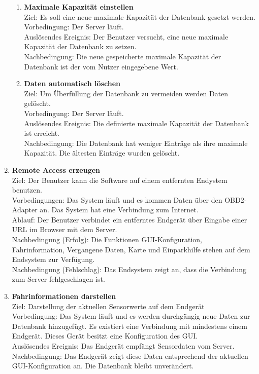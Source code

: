 \documentclass[pflichtenheft.tex]{subfiles}
\begin{document}
\begin{enumerate}
\begin{enumerate}
		\item{\textbf{Maximale Kapazität einstellen}} \\ Ziel: Es soll eine neue maximale Kapazität der Datenbank gesetzt werden. \\ Vorbedingung: Der Server läuft. \\ Auslösendes Ereignis: Der Benutzer versucht, eine neue maximale Kapazität der Datenbank zu setzen. \\ Nachbedingung: Die neue gespeicherte maximale Kapazität der Datenbank ist der vom Nutzer eingegebene Wert.
		
		\item{\textbf{Daten automatisch löschen}} \\ Ziel: Um Überfüllung der Datenbank zu vermeiden werden Daten gelöscht. \\ Vorbedingung: Der Server läuft. \\ Auslösendes Ereignis: Die definierte maximale Kapazität der Datenbank ist erreicht. \\ Nachbedingung: Die Datenbank hat weniger Einträge als ihre maximale Kapazität. Die ältesten Einträge wurden gelöscht.
		
	\end{enumerate} 

	\item{\textbf{Remote Access erzeugen}} \\ Ziel: Der Benutzer kann die Software auf einem entfernten Endystem benutzen.\\ Vorbedingungen: Das System läuft und es kommen Daten über den OBD2-Adapter an. Das System hat eine Verbindung zum Internet. \\ Ablauf: Der Benutzer verbindet ein entferntes Endgerät über Eingabe einer URL im Browser mit dem Server.\\ Nachbedingung (Erfolg): Die Funktionen GUI-Konfiguration, Fahrinformation, Vergangene Daten, Karte und Einparkhilfe stehen auf dem Endsystem zur Verfügung. \\ Nachbedingung (Fehlschlag): Das Endsystem zeigt an, dass die Verbindung zum Server fehlgeschlagen ist.

	\item{\textbf{Fahrinformationen darstellen}} \\ Ziel: Darstellung der aktuellen Sensorwerte auf dem Endgerät \\ Vorbedingung: Das System läuft und es werden durchgängig neue Daten zur Datenbank hinzugefügt. Es existiert eine Verbindung mit mindestens einem Endgerät. Dieses Gerät besitzt eine Konfiguration des GUI. \\ Auslösendes Ereignis: Das Endgerät empfängt Sensordaten vom Server.\\ Nachbedingung: Das Endgerät zeigt diese Daten entsprechend der aktuellen GUI-Konfiguration an. Die Datenbank bleibt unverändert.


\end{enumerate}
\end{document}
